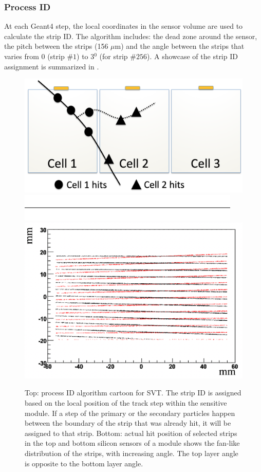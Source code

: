 \subsubsection{Process ID}

At each Geant4 step, the local coordinates in the sensor volume are used to calculate the strip ID.
The algorithm includes: the dead zone around the sensor, the pitch between the strips (156 $\mu$m) and the angle
between the strips that varies from 0 (strip $\# 1$) to 3$^0$ (for strip  $\# 256$). A showcase of the strip ID assignment
is summarized in .

\begin{figure}
	\centering
	\includegraphics[width=0.99\columnwidth,keepaspectratio]{img/bstHit.png}
	\includegraphics[width=0.99\columnwidth,keepaspectratio]{img/blank.png}
	\includegraphics[width=0.99\columnwidth,keepaspectratio]{img/bstStrip.png}
	\caption{Top: process ID algorithm cartoon for SVT. The strip ID is assigned based on the local position of the track
            step within the sensitive module. If a step of the primary or the secondary particles happen between the boundary
            of the strip that was already hit, it will be assigned to that strip. Bottom: actual hit position of selected
            strips in the top and bottom silicon sensors of a module shows the fan-like distribution of the strips,
            with increasing angle. The top layer angle is opposite to the bottom layer angle. }
	\label{fig:processID}
\end{figure}

